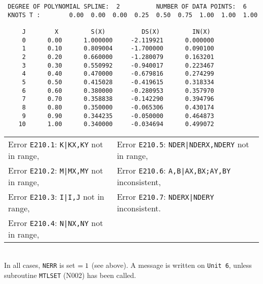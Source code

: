 \begin{verbatim}
 DEGREE OF POLYNOMIAL SPLINE:  2          NUMBER OF DATA POINTS:  6
 KNOTS T :        0.00  0.00  0.00  0.25  0.50  0.75  1.00  1.00  1.00
 
     J        X         S(X)          DS(X)         IN(X)
     0      0.00      1.000000     -2.119921      0.000000
     1      0.10      0.809004     -1.700000      0.090100
     2      0.20      0.660000     -1.280079      0.163201
     3      0.30      0.550992     -0.940017      0.223467
     4      0.40      0.470000     -0.679816      0.274299
     5      0.50      0.415028     -0.419615      0.318334
     6      0.60      0.380000     -0.280953      0.357970
     7      0.70      0.358838     -0.142290      0.394796
     8      0.80      0.350000     -0.065306      0.430174
     9      0.90      0.344235     -0.050000      0.464873
    10      1.00      0.340000     -0.034694      0.499072
\end{verbatim}
\Errorh
\begin{tabular}{l@{\qquad}l}
Error {\tt E210.1}:  {\tt K|KX,KY} not in range, &
Error {\tt E210.5}:  {\tt NDER|NDERX,NDERY} not in range,  \\
Error {\tt E210.2}:  {\tt M|MX,MY} not in range, &
Error {\tt E210.6}:  {\tt A,B|AX,BX;AY,BY} inconsistent,  \\
Error {\tt E210.3}:  {\tt I|I,J}   not in range, &
Error {\tt E210.7}:  {\tt NDERX|NDERY} inconsistent. \\
Error {\tt E210.4}:  {\tt N|NX,NY} not in range,
\end{tabular} \\[1mm]
In all cases, {\tt NERR} is set ${\tt =1}$ (see above). A message is
written on {\tt Unit 6}, unless subroutine {\tt MTLSET} (N002) has
been called.
\newpage
\Refer
